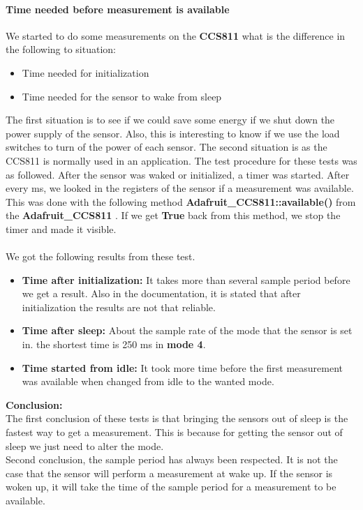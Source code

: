 \documentclass[11pt,a4paper]{article}
\begin{document}
\paragraph{Time needed before measurement is available}
We started to do some measurements on the \textbf{CCS811} what is the difference in the following to situation:
\begin{itemize}
	\item Time needed for initialization
	\item Time needed for the sensor to wake from sleep
\end{itemize}
The first situation is to see if we could save some energy if we shut down the power supply of the sensor. Also, this is interesting to know if we use the load switches to turn of the power of each sensor. The second situation is as the CCS811 is normally used in an application. The test procedure for these tests was as followed. After the sensor was waked or initialized, a timer was started. After every ms, we looked in the registers of the sensor if a measurement was available. This was done with the following method \textbf{Adafruit\_CCS811::available()} from the \textbf{Adafruit\_CCS811} \cite{lib_CCS811} . If we get \textbf{True} back from this method, we stop the timer and made it visible.
\\ \\
We got the following results from these test.
\begin{itemize}
\item \textbf{Time after initialization:} It takes more than several sample period before we get a result. Also in the documentation, it is stated that after initialization the results are not that reliable.
\item \textbf{Time after sleep:} About the sample rate of the mode that the sensor is set in. the shortest time is 250 ms in \textbf{mode 4}. 
\item \textbf{ Time started from idle:} It took more time before the first measurement was available when changed from idle to the wanted mode.
\end{itemize}
\textbf{Conclusion:} \\ The first conclusion of these tests is that bringing the sensors out of sleep is the fastest way to get a measurement. This is because for getting the sensor out of sleep we just need to alter the mode. 
\\ Second conclusion, the sample period has always been respected. It is not the case that the sensor will perform a measurement at wake up. If the sensor is woken up, it will take the time of the sample period for a measurement to be available.
\end{document}
